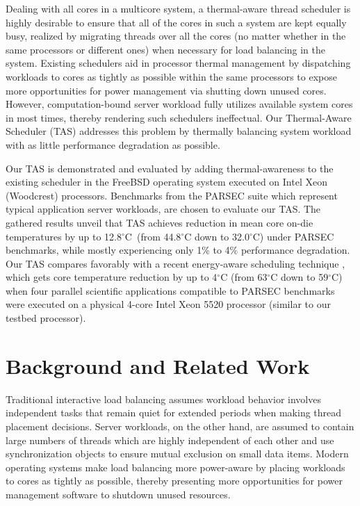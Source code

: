 \documentclass[times, 10pt,twocolumn]{IEEEtran}
\begin{document}
Dealing with all cores in a multicore system, a thermal-aware thread
scheduler is highly desirable to ensure that all of the cores in such a
system are kept equally busy, realized by migrating threads over all the
cores (no matter whether in the same processors or different ones) when
necessary for load balancing in the system.  Existing schedulers aid in
processor thermal management by dispatching workloads to cores as
tightly as possible within the same processors to expose more
opportunities for power management via shutting down unused cores.
However, computation-bound server workload fully utilizes available
system cores in most times, thereby rendering such schedulers
ineffectual.  Our Thermal-Aware Scheduler (TAS) addresses this problem
by thermally balancing system workload with as little performance
degradation as possible.  

Our TAS is demonstrated and evaluated by adding thermal-awareness to the
existing scheduler in the FreeBSD operating system executed on Intel
Xeon (Woodcrest) processors.  Benchmarks from the PARSEC suite which
represent typical application server workloads, are chosen to evaluate
our TAS.  The gathered results unveil that TAS achieves reduction in
mean core on-die temperatures by up to 12.8$^{\circ}$C\ (from 44.8$^\circ$C
down to 32.0$^\circ$C) under PARSEC benchmarks, while mostly experiencing only
1\% to 4\% performance degradation.  Our TAS compares favorably with a
recent energy-aware scheduling technique \cite{Sarood2011}, which gets
core temperature reduction by up to 4$^\circ$C (from 63$^\circ$C down to
59$^\circ$C) when four parallel scientific applications compatible to PARSEC
benchmarks were executed on a physical 4-core Intel Xeon 5520 processor
(similar to our testbed processor).

\section{Background and Related Work}
\label{sec:related}
Traditional interactive load balancing assumes workload behavior
involves independent tasks that remain quiet for extended periods when
making thread placement decisions.  Server workloads, on the other hand,
are assumed to contain large numbers of threads which are highly
independent of each other and use synchronization objects to ensure
mutual exclusion on small data items.  Modern operating systems make
load balancing more power-aware by placing workloads to cores as tightly
as possible, thereby presenting more opportunities for power management
software to shutdown unused resources.
\end{document}
